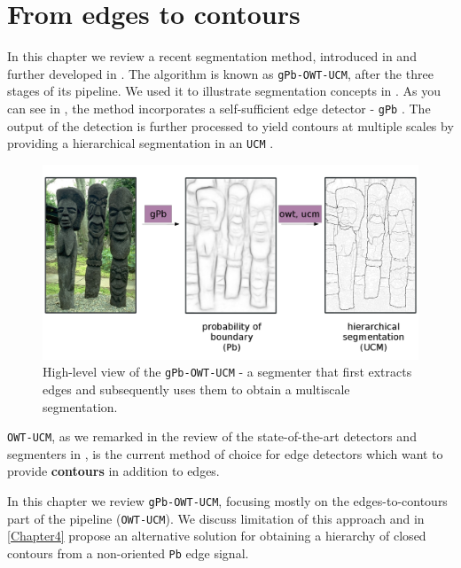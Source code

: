 \chapter{From edges to contours} %
\label{Chapter3}

In this chapter we review a recent segmentation method, introduced in \cite{Arbelaez09} and further developed %
in \cite{Arbelaez11}. The algorithm is known as {\tt gPb-OWT-UCM}, after the three stages of its pipeline. We used it to illustrate segmentation concepts in . As you can see in , the method incorporates a self-sufficient edge detector - {\tt gPb} \cite{Maire2008using}. The output of the detection is further processed to yield contours at multiple scales by %
providing a hierarchical segmentation in an {\tt UCM} \cite{Arbelaez2006boundary}.

\begin{figure}[t]
\centering
 \includegraphics[width=1\textwidth]{images/gPb-OWT-UCM/gPb-OWT-UCM-high-level.png}
\caption[High-level view of the {\tt gPb-OWT-UCM} algorithm]{High-level view of the {\tt gPb-OWT-UCM} - a segmenter that first extracts edges and subsequently uses them to obtain a multiscale segmentation.}
\label{fig:gPb-OWT-UCM-high-level}
\end{figure}

{\tt OWT-UCM}, as we remarked in the review of the state-of-the-art detectors and segmenters in , is the current method of choice for edge detectors which want to provide {\bf %
contours} in addition to edges.

In this chapter we review {\tt gPb-OWT-UCM}, focusing mostly on the edges-to-contours part of the pipeline ({\tt OWT-UCM}). We discuss limitation of this approach and in \cref{Chapter4} propose an alternative solution for obtaining a hierarchy of closed contours from a non-oriented {\tt Pb} edge signal.

